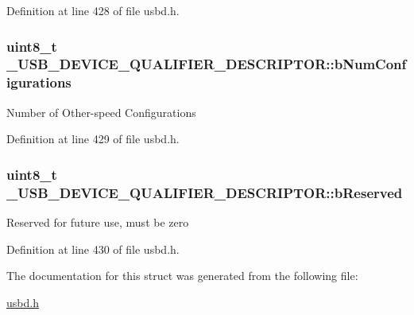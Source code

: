 Definition at line 428 of file usbd.\+h.

\subsubsection[{\texorpdfstring{b\+Num\+Configurations}{bNumConfigurations}}]{\setlength{\rightskip}{0pt plus 5cm}uint8\+\_\+t \+\_\+\+U\+S\+B\+\_\+\+D\+E\+V\+I\+C\+E\+\_\+\+Q\+U\+A\+L\+I\+F\+I\+E\+R\+\_\+\+D\+E\+S\+C\+R\+I\+P\+T\+O\+R\+::b\+Num\+Configurations}\hypertarget{struct__USB__DEVICE__QUALIFIER__DESCRIPTOR_a12db8a81d507d7019204c54867e460fd}{}\label{struct__USB__DEVICE__QUALIFIER__DESCRIPTOR_a12db8a81d507d7019204c54867e460fd}
Number of Other-\/speed Configurations 

Definition at line 429 of file usbd.\+h.

\subsubsection[{\texorpdfstring{b\+Reserved}{bReserved}}]{\setlength{\rightskip}{0pt plus 5cm}uint8\+\_\+t \+\_\+\+U\+S\+B\+\_\+\+D\+E\+V\+I\+C\+E\+\_\+\+Q\+U\+A\+L\+I\+F\+I\+E\+R\+\_\+\+D\+E\+S\+C\+R\+I\+P\+T\+O\+R\+::b\+Reserved}\hypertarget{struct__USB__DEVICE__QUALIFIER__DESCRIPTOR_a8d9c5ddf2a109289513b43ce1effb198}{}\label{struct__USB__DEVICE__QUALIFIER__DESCRIPTOR_a8d9c5ddf2a109289513b43ce1effb198}
Reserved for future use, must be zero 

Definition at line 430 of file usbd.\+h.



The documentation for this struct was generated from the following file\+:\begin{DoxyCompactItemize}
\item 
\hyperlink{usbd_8h}{usbd.\+h}\end{DoxyCompactItemize}
